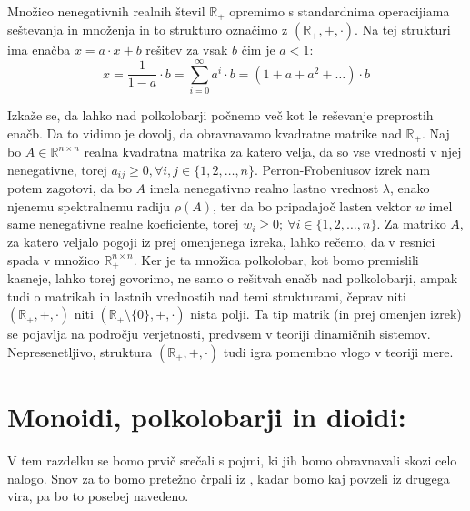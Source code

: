 \documentclass[mat1]{fmfdelo}
\newcommand{\R}{\mathbb{R}}
\newcommand{\Pplus}[1]{\mathbb{#1}_{+}}
\begin{document}
\begin{zgled}
	Množico nenegativnih realnih števil $\Pplus{R}$ opremimo s standardnima operacijiama seštevanja in množenja in to strukturo označimo z $(\Pplus{R}, +, \cdot)$. Na tej strukturi ima enačba $x = a\cdot x + b$ rešitev za vsak $b$ čim je $a < 1$: $$ x = \frac{1}{1 - a} \cdot b = \sum_{i = 0}^{\infty}a^i \cdot b = (1 + a + a^2 + \ldots)\cdot b$$
\end{zgled}

Izkaže se, da lahko nad polkolobarji počnemo več kot le reševanje preprostih enačb. Da to vidimo je dovolj, da obravnavamo kvadratne matrike nad $\Pplus{R}$. 
Naj bo $A \in\R^{n\times n}$ realna kvadratna matrika za katero velja, da so vse vrednosti v njej nenegativne, torej $a_{ij} \geq 0, \forall i, j \in \{1, 2, \ldots, n\}$. Perron-Frobeniusov izrek nam potem zagotovi, da bo $A$ imela nenegativno realno lastno vrednost $\lambda$, enako njenemu spektralnemu radiju $\rho(A)$, ter da bo pripadajoč lasten vektor $w$ imel same nenegativne realne koeficiente, torej $w_i \geq 0;~\forall i\in \{1, 2, \ldots, n\}$. 
Za matriko $A$, za katero veljalo pogoji iz prej omenjenega izreka, lahko rečemo, da v resnici spada v množico $\Pplus{R}^{n\times n}$. Ker je ta množica polkolobar, kot bomo premislili kasneje, lahko torej govorimo, ne samo o rešitvah enačb nad polkolobarji, ampak tudi o matrikah in lastnih vrednostih nad temi strukturami, čeprav niti $(\Pplus{R}, +, \cdot)$ niti $(\Pplus{R}\setminus\{0\}, +, \cdot)$ nista polji. Ta tip matrik (in prej omenjen izrek) se pojavlja na področju verjetnosti, predvsem v teoriji dinamičnih sistemov. Nepresenetljivo, struktura $(\Pplus{R}, +, \cdot)$ tudi igra pomembno vlogo v teoriji mere.

\section{Monoidi, polkolobarji in dioidi:}\label{sect:basicstructures}
V tem razdelku se bomo prvič srečali s pojmi, ki jih bomo obravnavali skozi celo nalogo. Snov za to bomo pretežno črpali iz \cite[poglavje 1]{bib:Gondran}, kadar bomo kaj povzeli iz drugega vira, pa bo to posebej navedeno. 
\end{document}
